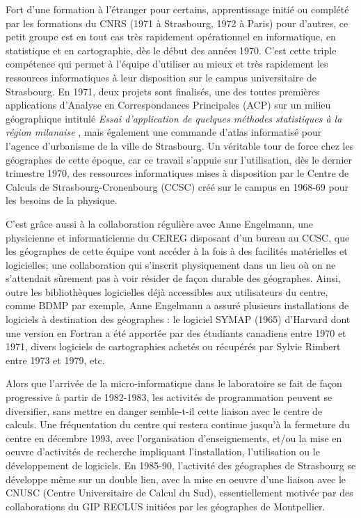 Fort d'une formation à l'étranger pour certains, apprentissage initié ou complété par les formations du CNRS (1971 à Strasbourg, 1972 à Paris) pour d'autres, ce petit groupe est en tout cas très rapidement opérationnel en informatique, en statistique et en cartographie, dès le début des années 1970. C'est cette triple compétence qui permet à l'équipe d'utiliser au mieux et très rapidement les ressources informatiques à leur disposition sur le campus universitaire de Strasbourg. En 1971, deux projets sont finalisés, une des toutes premières applications d’Analyse en Correspondances Principales (ACP) sur un milieu géographique intitulé \textit{Essai d’application de quelques méthodes statistiques à la région milanaise} \autocite{Dalmasso1971}, mais également une commande d'atlas informatisé pour l'agence d'urbanisme de la ville de Strasbourg. Un véritable tour de force chez les géographes de cette époque, car ce travail s'appuie sur l'utilisation, dès le dernier trimestre 1970, des ressources informatiques mises à disposition par le Centre de Calculs de Strasbourg-Cronenbourg (CCSC) créé sur le campus en 1968-69 pour les besoins de la physique.

C'est grâce aussi à la collaboration régulière avec Anne Engelmann, une physicienne et informaticienne du CEREG disposant d'un bureau au CCSC, que les géographes de cette équipe vont accéder à la fois à des facilités matérielles et logicielles; une collaboration qui s'inscrit physiquement dans un lieu où on ne s'attendait sûrement pas à voir résider de façon durable des géographes. Ainsi, outre les bibliothèques logicielles déjà accessibles aux utilisateurs du centre, comme BDMP par exemple, Anne Engelmann a assuré plusieurs installations de logiciels à destination des géographes : le logiciel SYMAP (1965) d'Harvard dont une version en Fortran a été apportée par des étudiants canadiens entre 1970 et 1971, divers logiciels de cartographies achetés ou récupérés par Sylvie Rimbert entre 1973 et 1979, etc.

Alors que l'arrivée de la micro-informatique dans le laboratoire se fait de façon progressive à partir de 1982-1983, les activités de programmation peuvent se diversifier, sans mettre en danger semble-t-il cette liaison avec le centre de calculs. Une fréquentation du centre qui restera continue jusqu'à la fermeture du centre en décembre 1993, avec l'organisation d'enseignements, et/ou la mise en oeuvre d'activités de recherche impliquant l'installation, l'utilisation ou le développement de logiciels. En 1985-90, l'activité des géographes de Strasbourg se développe même sur un double lien, avec la mise en oeuvre d'une liaison avec le CNUSC (Centre Universitaire de Calcul du Sud), essentiellement motivée par des collaborations du GIP RECLUS initiées par les géographes de Montpellier.

